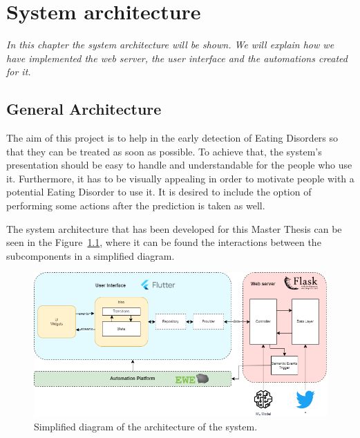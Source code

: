 \chapter{System architecture}
\label{chap:architecture}

\textit{In this chapter the system architecture will be shown. We will explain how we have implemented the web server, the user interface and the automations created for it.}

\clearpage

\section{General Architecture}


The aim of this project is to help in the early detection of Eating Disorders so that they can be treated as soon as possible. To achieve that, the system's presentation should be easy to handle and understandable for the people who use it. Furthermore, it has to be visually appealing in order to motivate people with a potential Eating Disorder to use it. It is desired to include the option of performing some actions after the prediction is taken as well.

The system architecture that has been developed for this Master Thesis can be seen in the Figure~\ref{fig:architecture}, where it can be found the interactions between the subcomponents in a simplified diagram.

\begin{figure}[h]
    \centering
    \includegraphics[width=1.05\textwidth]{img/architecture/architecture.png}
    \caption{Simplified diagram of the architecture of the system.}
    \label{fig:architecture}
\end{figure}


